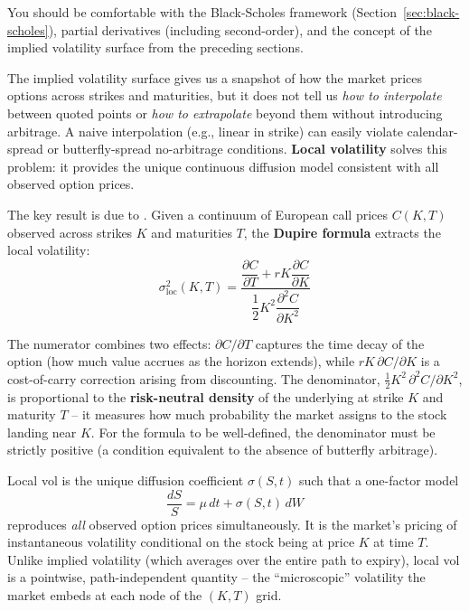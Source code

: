 \begin{prereq}
You should be comfortable with the Black-Scholes framework (Section~\ref{sec:black-scholes}), partial derivatives (including second-order), and the concept of the implied volatility surface from the preceding sections.
\end{prereq}

The implied volatility surface gives us a snapshot of how the market prices options across strikes and maturities, but it does not tell us \emph{how to interpolate} between quoted points or \emph{how to extrapolate} beyond them without introducing arbitrage.
A naive interpolation (e.g., linear in strike) can easily violate calendar-spread or butterfly-spread no-arbitrage conditions.
\textbf{Local volatility} solves this problem: it provides the unique continuous diffusion model consistent with all observed option prices.

The key result is due to \citet{Dupire1994}.
Given a continuum of European call prices $C(K,T)$ observed across strikes $K$ and maturities $T$, the \textbf{Dupire formula} extracts the local volatility:
\begin{equation}\label{eq:dupire}
  \sigma_{\text{loc}}^2(K,T) = \frac{\dfrac{\partial C}{\partial T} + rK\dfrac{\partial C}{\partial K}}{\dfrac{1}{2}K^2 \dfrac{\partial^2 C}{\partial K^2}}
\end{equation}

The numerator combines two effects: $\partial C / \partial T$ captures the time decay of the option (how much value accrues as the horizon extends), while $rK\,\partial C / \partial K$ is a cost-of-carry correction arising from discounting.
The denominator, $\frac{1}{2}K^2\,\partial^2 C / \partial K^2$, is proportional to the \textbf{risk-neutral density} of the underlying at strike $K$ and maturity $T$ -- it measures how much probability the market assigns to the stock landing near $K$.
For the formula to be well-defined, the denominator must be strictly positive (a condition equivalent to the absence of butterfly arbitrage).

\begin{intuition}
Local vol is the unique diffusion coefficient $\sigma(S,t)$ such that a one-factor model
\[
  \frac{dS}{S} = \mu\,dt + \sigma(S,t)\,dW
\]
reproduces \emph{all} observed option prices simultaneously.
It is the market's pricing of instantaneous volatility conditional on the stock being at price $K$ at time $T$.
Unlike implied volatility (which averages over the entire path to expiry), local vol is a pointwise, path-independent quantity -- the ``microscopic'' volatility the market embeds at each node of the $(K,T)$ grid.
\end{intuition}

